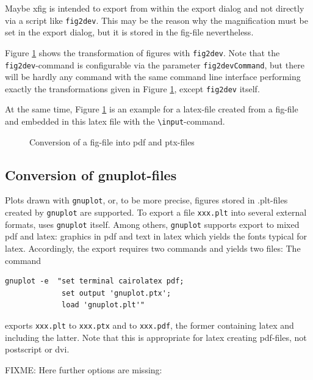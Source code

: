 \documentclass[12pt]{article}
\begin{document}
Maybe xfig is intended to export from within the export dialog 
and not directly via a script like {\tt fig2dev}. 
This may be the reason 
why the magnification must be set in the export dialog, 
but it is stored in the fig-file nevertheless. 

Figure \ref{fig:fig2dev} shows the transformation 
of figures with {\tt fig2dev}. 
Note that the {\tt fig2dev}-command is configurable 
via the parameter {\tt fig2devCommand}, 
but there will be hardly any command with the same command line interface 
performing exactly the transformations given in Figure \ref{fig:fig2dev}, 
except {\tt fig2dev} itself. 

At the same time, Figure \ref{fig:fig2dev} is an example 
for a latex-file created from a fig-file 
and embedded in this latex file 
with the {\tt\textbackslash input}-command. 


\begin{figure}[htb]
\begin{center}

\end{center}
\caption{\label{fig:fig2dev}Conversion of a fig-file into pdf and ptx-files}
\end{figure}


\subsection{Conversion of gnuplot-files}\label{subsec:gnuplot2pdf}

Plots drawn with {\tt gnuplot}, or, to be more precise, 
figures stored in .plt-files created by {\tt gnuplot} are supported. 
To export a file {\tt xxx.plt} into several external formats, 
uses {\tt gnuplot} itself. 
Among others, {\tt gnuplot} supports export to mixed pdf and latex: 
graphics in pdf and text in latex which yields the fonts typical for latex. 
Accordingly, the export requires two commands and yields two files: 
The command 
%
\begin{verbatim}
gnuplot -e  "set terminal cairolatex pdf;
             set output 'gnuplot.ptx';
             load 'gnuplot.plt'"
\end{verbatim}
%
exports {\tt xxx.plt} to {\tt xxx.ptx} and to {\tt xxx.pdf}, 
the former containing latex and including the latter. 
Note that this is appropriate for latex creating pdf-files, 
not postscript or \gls{dvi}. 

FIXME: 
Here further options are missing: 
\end{document}
